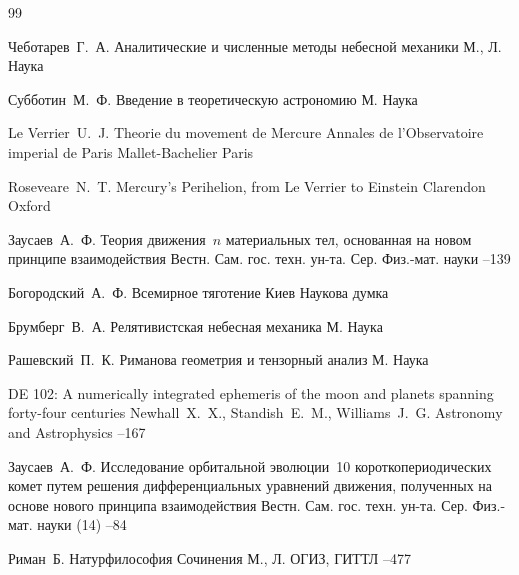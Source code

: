 \begin{thebibliography}{99}

\by Чеботарев~Г.~А.
\book Аналитические и численные методы небесной механики
\publaddr М., Л.
\publ Наука

\by Субботин~М.~Ф.
\book Введение в теоретическую астрономию
\publaddr М.
\publ Наука

\by Le Verrier~U.~J.
\book Theorie du movement de Mercure
\serial Annales de l'Observatoire imperial de Paris 
\publ Mallet-Bachelier
\publaddr Paris

\by Roseveare~N.~T.
\book Mercury's Perihelion, from Le Verrier to Einstein
\publ Clarendon
\publaddr Oxford

\by Заусаев~А.~Ф.
\paper Теория движения~$n$ материальных тел, основанная на новом принципе взаимодействия
\jour  Вестн. Сам. гос. техн. ун-та. Сер. Физ.-мат. науки
--139


\by Богородский~А.~Ф.
\book Всемирное тяготение
\publaddr Киев
\publ Наукова думка

\by Брумберг~В.~А.
\book Релятивистская небесная механика
\publaddr М.
\publ Наука

\by Рашевский~П.~К.
\book Риманова геометрия и тензорный анализ
\publaddr М.
\publ Наука

\paper DE 102: A numerically integrated ephemeris of the moon and planets spanning forty-four centuries
\by Newhall~X.~X., Standish~E.~M., Williams~J.~G.
\jour  Astronomy and Astrophysics 
--167


\by Заусаев~А.~Ф.
\paper Исследование орбитальной эволюции~10 короткопериодических комет путем решения дифференциальных уравнений движения, полученных на основе нового принципа взаимодействия
\jour Вестн. Сам. гос. техн. ун-та. Сер. Физ.-мат. науки
(14)
--84

\by Риман~Б.
\paper Натурфилософия
\inbook Сочинения
\publaddr М., Л.
\publ ОГИЗ, ГИТТЛ
–477


\end{thebibliography}
